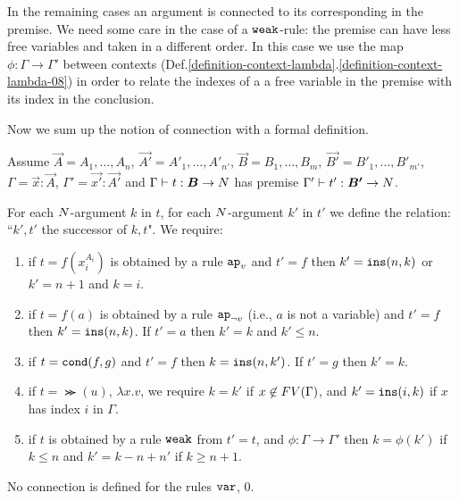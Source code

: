 In the remaining cases an argument is connected to its corresponding in the 
premise. We need some care in the case of a ${\tt weak}$-rule: the premise can
have less free variables and taken in a different order. 
In this case we use the map $\phi:\Gamma \rightarrow \Gamma'$ between contexts 
(Def.\ref{definition-context-lambda}.\ref{definition-context-lambda-08}) 
in order to relate the indexes of a a free variable in the premise with its index in the 
conclusion. 

Now we sum up the notion of connection with a formal definition.



\begin{definition}
Assume $\vec{A} = A_1, \ldots, A_n$, $\vec{A'} = A'_1, \ldots, A'_{n'}$,
$\vec{B}=B_1, \ldots, B_m$, $\vec{B'}=B'_1, \ldots, B'_{m'}$,
$\Gamma = \vec{x}:\vec{A}$,
$\Gamma' = \vec{x'}:\vec{A'}$
and $\Gamma \vdash t:\vec{B} \rightarrow \N$
has premise $\Gamma' \vdash t':\vec{B'} \rightarrow \N$.


For each ${N}$-argument $k$ in $t$, for each ${N}$-argument $k'$ in $t'$ we define 
the relation: ``$k',t'$ the successor of $k,t$". We require:
\begin{enumerate}

\item
if $t=f(x_i^{A_i})$ is obtained by a rule $\apvar$ and $t'=f$ 
then $k' = {\tt ins}(n,k)$ or $k'=n+1$ and $k=i$.

\item
if $t=f(a)$ is obtained by a rule $\apnotvar$ (i.e., $a$ is not a variable) and $t'=f$ 
then $k' = {\tt ins}(n,k)$. If $t'=a$ then $k'=k$ and $k' \le n$.

\item
if $t={\tt cond}(f,g)$ and $t'=f$ 
then %
$k = {\tt ins}(n,k')$. 
If $t'=g$ then $k'=k$.

\item
if $t = \Succ(u)$, $\lambda x.v$, we require $k = k'$ if $x \not \in {{\relax FV}}(\Gamma)$,
and $k' = {\tt ins}(i,k)$ if $x$ has index $i$ in $\Gamma$.

\item
if $t$ is obtained by a rule ${\tt weak}$ from $t'=t$, and 
$\phi:\Gamma \rightarrow \Gamma'$ then $k = \phi(k')$ if $k \le n$
and $k' = k - n + n'$ if $k \ge n+1$.

\end{enumerate}
No connection is defined for the rules ${\tt var}$, $0$.
\end{definition}



